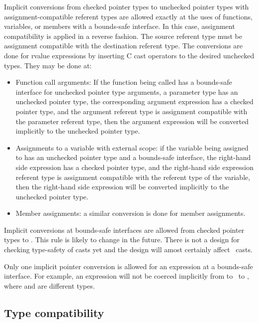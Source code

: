 Implicit conversions from checked pointer types to unchecked pointer types
with assignment-compatible referent types are allowed exactly at the uses of functions,
variables, or members with a  bounds-safe interface.  In this case, assignment
compatibility is applied in a reverse fashion.  The source referent type must be
assignment compatible with the destination referent type.  The conversions are done for rvalue expressions by inserting C cast operators to the desired unchecked types.
They may be done at:
\begin{itemize}
\item Function call arguments: If the function being called has a
      bounds-safe interface for unchecked pointer type arguments, a parameter
      type has an unchecked pointer type, the corresponding argument expression
      has a checked pointer type, and the argument referent type is assignment
      compatible with the parameter referent type, then the argument expression
      will be converted implicitly to the unchecked pointer type.
\item Assignments to a variable with external scope: if the variable being
     assigned to has an unchecked pointer type and a bounds-safe interface, the
     right-hand side expression has a checked pointer type, and the right-hand
     side expression referent type is assignment compatible with the referent
     type of the variable, then the right-hand side expression will be converted
     implicitly to the unchecked pointer type.
\item
   Member assignments: a similar conversion is done for member assignments.
\end{itemize}

Implicit conversions at bounds-safe interfaces are allowed from checked pointer types to
\uncheckedptrvoid.  This rule is likely to change in the future.  There is not a  design for
checking type-safety of casts yet and the design will amost certainly affect 
\uncheckedptrvoid\ casts.

Only one implicit pointer conversion is allowed for an expression at a bounds-safe
interface.  For example, an expression will not be
coerced implicitly from  to \uncheckedptrvoid\ to
, where  and  are different types.

\subsection{Type compatibility}

